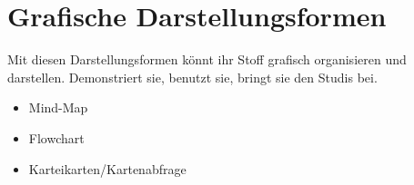 \chapter{Grafische Darstellungsformen}

Mit diesen Darstellungsformen könnt ihr Stoff grafisch organisieren und darstellen. Demonstriert sie, benutzt sie, bringt sie den Studis bei.

\begin{itemize}
 \item Mind-Map
 \item Flowchart
 \item Karteikarten/Kartenabfrage
\end{itemize}
